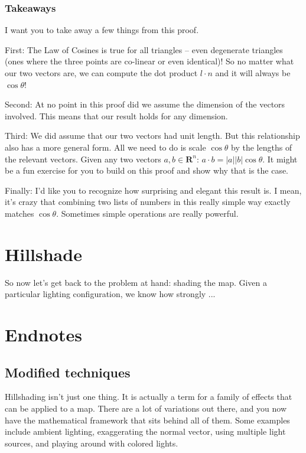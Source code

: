 \documentclass{article}
\begin{document}
\subsubsection{Takeaways}

I want you to take away a few things from this proof.

First: The Law of Cosines is true for all triangles -- even degenerate triangles (ones where the three points are co-linear or even identical)!
So no matter what our two vectors are, we can compute the dot product $l \cdot n$ and it will always be $\cos \theta$!

Second: At no point in this proof did we assume the dimension of the vectors involved.
This means that our result holds for any dimension.

Third: We did assume that our two vectors had unit length.
But this relationship also has a more general form.
All we need to do is scale $\cos \theta$ by the lengths of the relevant vectors.
Given any two vectors $ a, b \in \mathbf{R}^n$: $a \cdot b = |a| |b| \cos \theta$.
It might be a fun exercise for you to build on this proof and show why that is the case.

Finally: I'd like you to recognize how surprising and elegant this result is.
I mean, it's crazy that combining two lists of numbers in this really simple way exactly matches $\cos \theta$.
Sometimes simple operations are really powerful.

\section{Hillshade}

So now let's get back to the problem at hand: shading the map.
Given a particular lighting configuration, we know how strongly ...

\section{Endnotes}

\subsection{Modified techniques}

Hillshading isn't just one thing.
It is actually a term for a family of effects that can be applied to a map.
There are a lot of variations out there, and you now have the mathematical framework that sits behind all of them.
Some examples include ambient lighting, exaggerating the normal vector, using multiple light sources, and playing around with colored lights.
\end{document}
